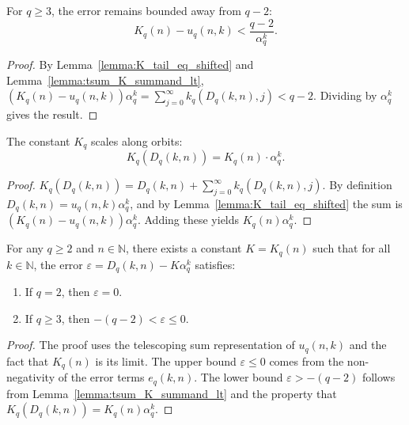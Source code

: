 \begin{lemma}
  \label{lemma:K_sub_u_lt}
  \leanok
  For $q \ge 3$, the error remains bounded away from $q-2$:
  \[ K_q(n) - u_q(n, k) < \frac{q - 2}{\alpha_q^k}. \]
  \begin{proof}
    \leanok
    By Lemma~\ref{lemma:K_tail_eq_shifted} and Lemma~\ref{lemma:tsum_K_summand_lt},
    $(K_q(n) - u_q(n, k)) \alpha_q^k = \sum_{j=0}^{\infty} k_q(D_q(k, n), j) < q - 2$.
    Dividing by $\alpha_q^k$ gives the result.
  \end{proof}
\end{lemma}

\begin{lemma}
  \label{lemma:K_const_iterate}
  \leanok
  The constant $K_q$ scales along orbits:
  \[ K_q(D_q(k, n)) = K_q(n) \cdot \alpha_q^k. \]
  \begin{proof}
    \leanok
    $K_q(D_q(k, n)) = D_q(k, n) + \sum_{j=0}^{\infty} k_q(D_q(k, n), j)$.
    By definition $D_q(k, n) = u_q(n, k) \alpha_q^k$, and by Lemma~\ref{lemma:K_tail_eq_shifted} the sum is $(K_q(n) - u_q(n, k)) \alpha_q^k$.
    Adding these yields $K_q(n) \alpha_q^k$.
  \end{proof}
\end{lemma}

\begin{theorem}
  \label{thm:Diter'_asymptotic}
  \leanok
  For any $q \ge 2$ and $n \in \mathbb{N}$, there exists a constant $K = K_q(n)$ such that for all $k \in \mathbb{N}$, the error $\varepsilon = D_q(k, n) - K \alpha_q^k$ satisfies:
  \begin{enumerate}
    \item If $q = 2$, then $\varepsilon = 0$.
    \item If $q \ge 3$, then $-(q - 2) < \varepsilon \le 0$.
  \end{enumerate}
  \begin{proof}
    \leanok
    The proof uses the telescoping sum representation of $u_q(n, k)$ and the fact that $K_q(n)$ is its limit.
    The upper bound $\varepsilon \le 0$ comes from the non-negativity of the error terms $e_q(k, n)$.
    The lower bound $\varepsilon > -(q-2)$ follows from Lemma~\ref{lemma:tsum_K_summand_lt} and the property that $K_q(D_q(k, n)) = K_q(n) \alpha_q^k$.
  \end{proof}
\end{theorem}

